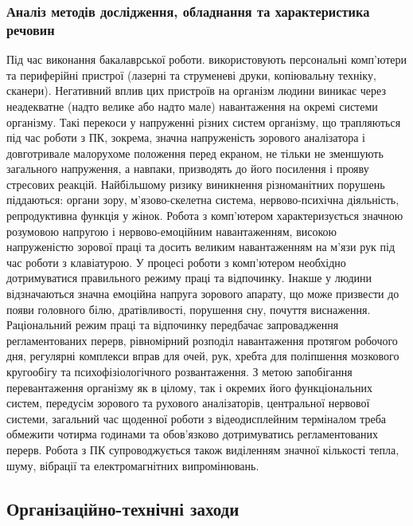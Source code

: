 \documentclass[12pt,a4paper]{article}
\begin{document}
\subsubsection{Аналіз методів дослідження, обладнання та характеристика речовин}
Під час виконання бакалаврської роботи. використовують персональні комп’ютери та периферійні пристрої (лазерні та струменеві друки, копіювальну техніку, сканери). Негативний вплив цих пристроїв на організм людини виникає через неадекватне (надто велике або надто мале) навантаження на окремі системи організму. Такі перекоси у напруженні різних систем організму, що трапляються під час роботи з ПК, зокрема, значна напруженість зорового аналізатора і довготривале малорухоме положення перед екраном, не тільки не зменшують загального напруження, а навпаки, призводять до його посилення і прояву стресових реакцій. Найбільшому ризику виникнення різноманітних порушень піддаються: органи зору, м’язово-скелетна система, нервово-психічна діяльність, репродуктивна функція у жінок.
Робота з комп’ютером характеризується значною розумовою напругою і нервово-емоційним навантаженням, високою напруженістю зорової праці та досить великим навантаженням на м’язи рук під час роботи з клавіатурою.
У процесі роботи з комп'ютером необхідно дотримуватися правильного режиму праці та відпочинку. Інакше у людини відзначаються значна емоційна напруга зорового апарату, що може призвести до появи головного білю, дратівливості, порушення сну, почуття виснаження. Раціональний режим праці та відпочинку передбачає запровадження регламентованих перерв, рівномірний розподіл навантаження протягом робочого дня, регулярні комплекси вправ для очей, рук, хребта для  поліпшення мозкового кругообігу та психофізіологічного розвантаження.
З метою запобігання перевантаження організму як в цілому, так і окремих його функціональних систем, передусім зорового та рухового аналізаторів, центральної нервової системи, загальний час щоденної роботи з відеодисплейним терміналом треба обмежити чотирма годинами та обов’язково дотримуватись регламентованих перерв.
Робота з ПК супроводжується також виділенням значної кількості тепла, шуму, вібрації та електромагнітних випромінювань.

\subsection{Організаційно-технічні заходи}
\end{document}
